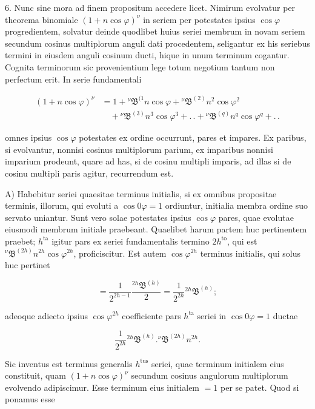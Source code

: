 \par\noindent{}%
\hspace*{\parindent}6. Nunc sine mora ad finem propositum accedere licet. Nimirum evolvatur per theorema binomiale $(1+n\cos\varphi)^{\nu}$ in seriem per potestates ipsius $\cos\varphi$ progredientem, solvatur deinde quodlibet huius seriei membrum in novam seriem secundum cosinus multiplorum anguli dati procedentem, seligantur ex his seriebus termini in eiusdem anguli cosinum ducti, hique in unum terminum cogantur. Cognita terminorum sic provenientium lege totum negotium tantum non perfectum erit. In serie fundamentali

\[
\begin{aligned}
(1+n\cos\varphi)^{\nu} & = 1 + {}^{\nu}\mathfrak{B}^{(1} n\cos\varphi + {}^{\nu}\mathfrak{B}^{(2)} n^{2}\cos\varphi^{2} \\&\quad + {}^{\nu}\mathfrak{B}^{(3)} n^{3}\cos\varphi^{3} + .\,. + {}^{\nu}\mathfrak{B}^{(q)} n^{q}\cos\varphi^{q} + .\,.
\end{aligned}
\]

\noindent omnes ipsius $\cos\varphi$ potestates ex ordine occurrunt, pares et impares. Ex paribus, si evolvantur, nonnisi cosinus multiplorum parium, ex imparibus nonnisi imparium prodeunt, quare ad has, si de cosinu multipli imparis, ad illas si de cosinu multipli paris agitur, recurrendum est.

A) Habebitur seriei quaesitae terminus initialis, si ex omnibus propositae terminis, illorum, qui evoluti a $\cos 0\varphi = 1$ ordiuntur, initialia membra ordine suo servato uniantur. Sunt vero solae potestates ipsius $\cos\varphi$ pares, quae evolutae eiusmodi membrum initiale praebeant. Quaelibet harum partem huc pertinentem praebet; $h^{\text{ta}}$ igitur pars ex seriei fundamentalis termino $2h^{\text{to}}$, qui est ${}^{\nu}\mathfrak{B}^{(2h)} n^{2h}\cos\varphi^{2h}$, proficiscitur. Est autem $\cos\varphi^{2h}$ terminus initialis, qui solus huc pertinet

\[
= \frac{1}{2^{2h-1}} \frac{{}^{2h}\mathfrak{B}^{(h)}}{2} = \frac{1}{2^{2h}} {}^{2h}\mathfrak{B}^{(h)};
\]

\noindent adeoque adiecto ipsius $\cos\varphi^{2h}$ coefficiente pars $h^{\text{ta}}$ seriei in $\cos 0\varphi = 1$ ductae

\[
\frac{1}{2^{2h}} {}^{2h}\mathfrak{B}^{(h)}  .  {}^{\nu}\mathfrak{B}^{(2h)} n^{2h}.
\]

\noindent Sic inventus est terminus generalis $h^{\text{tus}}$ seriei, quae terminum initialem eius constituit, quam $(1+n\cos\varphi)^{\nu}$ secundum cosinus angulorum multiplorum evolvendo adipiscimur. Esse terminum eius initialem $=1$ per se patet. Quod si ponamus esse

